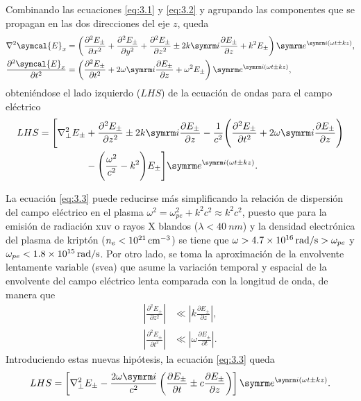 Combinando las ecuaciones \eqref{eq:3.1} y \eqref{eq:3.2} y agrupando las componentes que se propagan en las dos direcciones del eje $z$, queda 
\begin{align}
    \grad^2\symcal{E}_x
    &=
    \left(\frac{\partial^2 E_{\pm}}{\partial x^2} + \frac{\partial^2 E_{\pm}}{\partial y^2} + \frac{\partial^2 E_{\pm}}{\partial z^2} \pm 2k\iu\frac{\partial E_{\pm}}{\partial z} + k^2 E_{\pm}\right)\eu^{\iu(\omega t \pm kz)}, \\
    \frac{\partial^2 \symcal{E}_x}{\partial t^2}
    &=
    \left(\frac{\partial^2 E_{\pm}}{\partial t^2} + 2\omega\iu\frac{\partial E_{\pm}}{\partial z} + \omega^2E_{\pm}\right)\eu^{\iu(\omega t \pm kz)}, 
\end{align}
\noindent
obteniéndose el lado izquierdo ($LHS$) de la ecuación de ondas para el campo eléctrico
\begin{equation}\label{eq:3.3}
    \begin{split}
        LHS 
        =
        \Bigg[\grad^2_{\perp} E_{\pm} &+ \frac{\partial^2 E_{\pm}}{\partial z^2} \pm 2k\iu \frac{\partial E_{\pm}}{\partial z} 
        -\frac{1}{c^2} \Bigg(\frac{\partial^2 E_{\pm}}{\partial t^2} + 2\omega\iu\frac{\partial E_{\pm}}{\partial z} \Bigg) \\
        &- \Bigg(\frac{\omega^2}{c^2} - k^2 \Bigg)E_{\pm} \Bigg] \eu^{\iu(\omega t \pm kz)}.
    \end{split}
\end{equation}

La ecuación \eqref{eq:3.3} puede reducirse más simplificando la relación de dispersión del campo eléctrico en el plasma $\omega^2 = \omega_{pe}^2 + k^2c^2\approx k^2c^2$, puesto que para la emisión de radiación \acrshort{xuv} o rayos X blandos ($\lambda<\qty{40}{nm}$) y la densidad electrónica del plasma de kriptón ($n_e<\qty{d21}{cm^{-3}}$) se tiene 
que $\omega>\qty{4,7d16}{rad/s}>\omega_{pe}$ y $\omega_{pe}<\qty{1,8d15}{rad/s}$. Por otro lado, se toma la aproximación de la envolvente lentamente variable (\acrshort{svea}) que asume la variación temporal y espacial de la envolvente del campo eléctrico lenta comparada con la longitud de onda, de manera que
\begin{align}
    \left|\frac{\partial^2 E_{\pm}}{\partial z^2}\right| &\ll \left|k\frac{\partial E_{\pm}}{\partial z}\right|, \\
     \left|\frac{\partial^2 E_{\pm}}{\partial t^2}\right| &\ll \left|\omega\frac{\partial E_{\pm}}{\partial t}\right|.
\end{align}
\noindent
Introduciendo estas nuevas hipótesis, la ecuación \eqref{eq:3.3} queda
\begin{equation}
    LHS 
    =
    \left[\grad^2_{\perp}E_{\pm} - \frac{2\omega\iu}{c^2}\left(\frac{\partial E_{\pm}}{\partial t} \pm c\frac{\partial E_{\pm}}{\partial z}\right)\right]\eu^{\iu(\omega t \pm kz)}.
\end{equation}


